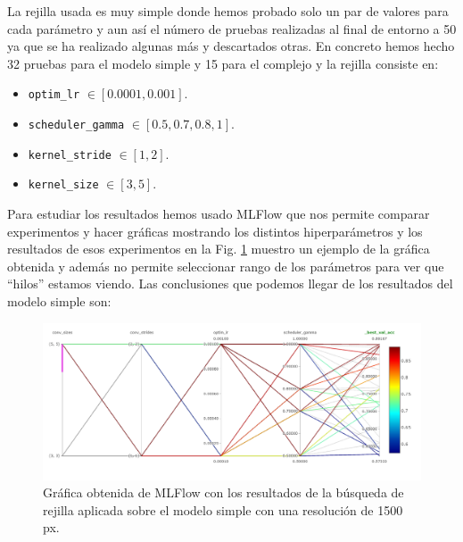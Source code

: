 \documentclass[a4paper,12pt,twoside,titlepage]{article}
\newcommand{\inline}[1]{\texttt{#1}}
\begin{document}
La rejilla usada es muy simple donde hemos probado solo un par de valores para cada parámetro y aun así el número de pruebas realizadas al final de entorno a 50 ya que se ha realizado algunas más y descartados otras. En concreto hemos hecho 32 pruebas para el modelo simple y 15 para el complejo y la rejilla consiste en:
\begin{itemize}
  \item \inline{optim_lr} $\in \left[0.0001, 0.001\right]$.
  \item \inline{scheduler_gamma} $\in \left[0.5, 0.7, 0.8, 1\right]$.
  \item \inline{kernel_stride} $\in \left[1, 2\right]$.
  \item \inline{kernel_size} $\in \left[3, 5\right]$.
\end{itemize}



Para estudiar los resultados hemos usado MLFlow que nos permite comparar experimentos y hacer gráficas mostrando los distintos hiperparámetros y los resultados de esos experimentos en la Fig. \ref{fig:estudio_kernel} muestro un ejemplo de la gráfica obtenida y además no permite seleccionar rango de los parámetros para ver que ``hilos'' estamos viendo. Las conclusiones que podemos llegar de los resultados del modelo simple son:

\begin{figure}[h!]
  \centering
  \includegraphics[scale=0.65, center]{studio_kernel_simple.PNG}
  \caption{Gráfica obtenida de MLFlow con los resultados de la búsqueda de rejilla aplicada sobre el modelo simple con una resolución de 1500 px.}
  \label{fig:estudio_kernel}
\end{figure}
\end{document}
